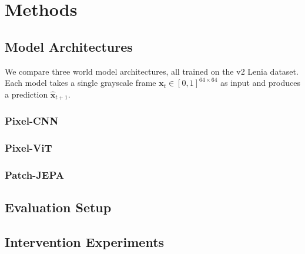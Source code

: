 \section{Methods}

\subsection{Model Architectures}

We compare three world model architectures, all trained on the v2 Lenia dataset.
Each model takes a single grayscale frame $\mathbf{x}_t \in [0,1]^{64\times64}$
as input and produces a prediction $\hat{\mathbf{x}}_{t+1}$.

\subsubsection{Pixel-CNN}

\subsubsection{Pixel-ViT}

\subsubsection{Patch-JEPA}

\subsection{Evaluation Setup}

\subsection{Intervention Experiments}

